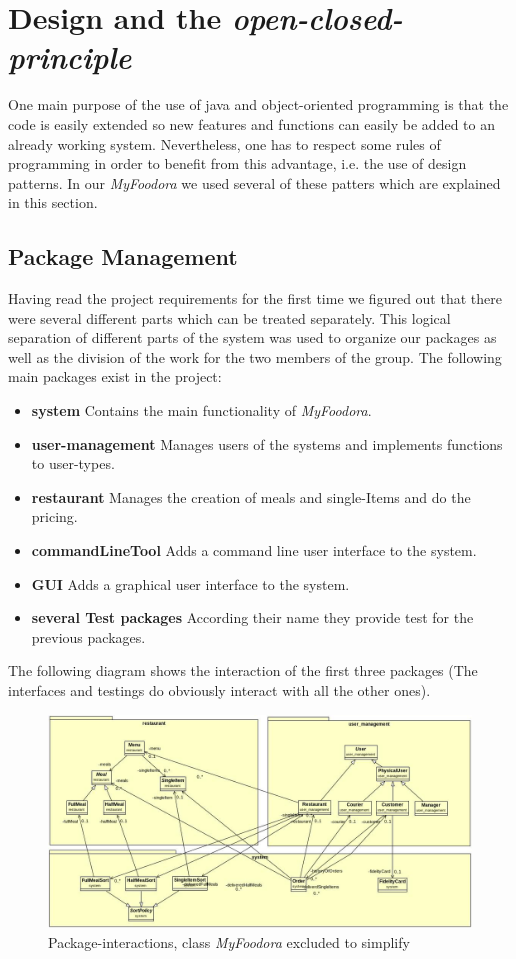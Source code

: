 \section{Design and the \textit{open-closed-principle}}
One main purpose of the use of java and object-oriented programming is that the code is easily
extended so new features and functions can easily be added to an already working system.
Nevertheless, one has to respect some rules of programming in order to benefit from this
advantage, i.e. the use of design patterns.
In our \textit{MyFoodora} we used several of these patters which are explained in this section.

\subsection{Package Management}
\label{sub:package_management}

Having read the project requirements for the first time we figured out that there were several
different parts which can be treated separately. This logical separation of different parts of the
system was used to organize our packages as well as the division of the work for the two members
of the group. The following main packages exist in the project:
\begin{itemize}
	\item{\textbf{system}} Contains the main functionality of \textit{MyFoodora}.
	\item{\textbf{user-management}} Manages users of the systems and implements functions
		to user-types.
	\item{\textbf{restaurant}} Manages the creation of meals and single-Items and do the
		pricing.
	\item{\textbf{commandLineTool}} Adds a command line user interface to the system.
	\item{\textbf{GUI}} Adds a graphical user interface to the system.
	\item{\textbf{several Test packages}} According their name they provide test for the
		previous packages.
\end{itemize}

The following diagram shows the interaction of the first three packages (The interfaces and
testings do obviously interact with all the other ones).

\begin{figure}[H]
	\centering
	\includegraphics[width=1\linewidth]{./ima/packages.jpg}
	\caption{Package-interactions, class \textit{MyFoodora} excluded to simplify}
	\label{fig:packages}
\end{figure}

